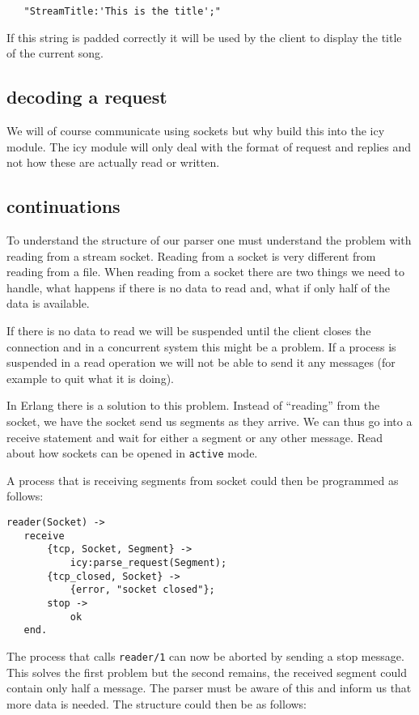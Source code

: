 \documentclass[a4paper,dvips,11pt]{article}
\begin{document}
\begin{verbatim}
   "StreamTitle:'This is the title';"
\end{verbatim}

If this string is padded correctly it will be used by the client to
display the title of the current song.


\subsection{decoding a request}

We will of course communicate using sockets but why build this into
the icy module. The icy module will only deal with the format of
request and replies and not how these are actually read or written.

\subsection{continuations}

To understand the structure of our parser one must understand the
problem with reading from a stream socket. Reading from a socket is
very different from reading from a file. When reading from a socket
there are two things we need to handle, what happens if there is no
data to read and, what if only half of the data is available. 

If there is no data to read we will be suspended until the client
closes the connection and in a concurrent system this might be a
problem. If a process is suspended in a read operation we will not be
able to send it any messages (for example to quit what it is doing).

In Erlang there is a solution to this problem. Instead of ``reading''
from the socket, we have the socket send us segments as they
arrive. We can thus go into a receive statement and wait for either a
segment or any other message. Read about how sockets can be opened in
{\tt active} mode.

A process that is receiving segments from socket
could then be programmed as follows:

\begin{verbatim}
reader(Socket) ->
   receive
       {tcp, Socket, Segment} ->
           icy:parse_request(Segment);
       {tcp_closed, Socket} ->
           {error, "socket closed"};
       stop ->
           ok
   end.
\end{verbatim}

The process that calls {\tt reader/1} can now be aborted by sending a
stop message. This solves the first problem but the second remains,
the received segment could contain only half a message. The parser
must be aware of this and inform us that more data is needed. The
structure could then be as follows:
\end{document}
